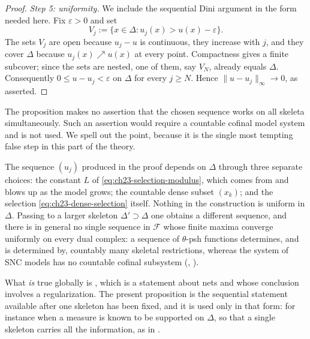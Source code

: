 \begin{proof}
\emph{Step 5: uniformity.}
We include the sequential Dini argument in the form needed here.  Fix
\(\varepsilon>0\) and set
\[
 V_j:=\{x\in\Delta:u_j(x)>u(x)-\varepsilon\}.
\]
The sets \(V_j\) are open because \(u_j-u\) is continuous, they increase
with \(j\), and they cover \(\Delta\) because \(u_j(x)\nearrow u(x)\) at
every point.  Compactness gives a finite subcover; since the sets are nested,
one of them, say \(V_N\), already equals \(\Delta\).  Consequently
\(0\leq u-u_j<\varepsilon\) on \(\Delta\) for every \(j\geq N\).  Hence
\(\|u-u_j\|_\infty\to0\), as asserted.
\end{proof}

\begin{remark}
\label{rem:ch23-selection-scope}
The proposition makes no assertion that the chosen sequence works on all
skeleta simultaneously.  Such an assertion would require a countable
cofinal model system and is not used.  We spell out the point, because it is
the single most tempting false step in this part of the theory.

The sequence \((u_j)\) produced in the proof depends on \(\Delta\) through
three separate choices: the constant \(L\) of
\eqref{eq:ch23-selection-modulus}, which comes from
 and blows up as the model grows; the
countable dense subset \((x_k)\); and the selection
\eqref{eq:ch23-dense-selection} itself.  Nothing in the construction is
uniform in \(\Delta\).  Passing to a larger skeleton \(\Delta'\supset\Delta\)
one obtains a different sequence, and there is in general no single sequence
in \(\mathcal F\) whose finite maxima converge uniformly on every dual
complex: a sequence of \(\theta\)-psh functions determines, and is
determined by, countably many skeletal restrictions, whereas the system of
SNC models has no countable cofinal subsystem
(, ).

What \emph{is} true globally is , which is a
statement about nets and whose conclusion involves a regularization.  The
present proposition is the sequential statement available after one skeleton
has been fixed, and it is used only in that form: for instance when a measure
is known to be supported on \(\Delta\), so that a single skeleton carries all
the information, as in .
\end{remark}

